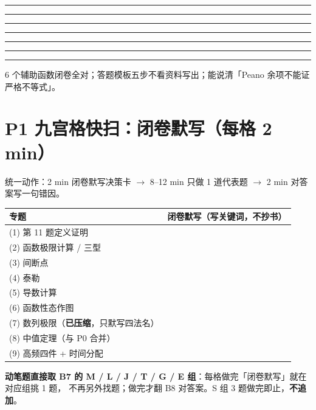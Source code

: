 \documentclass[10pt,a4paper]{ctexart}
\renewcommand{\arraystretch}{1.30}
\begin{document}
\par\smallskip\noindent\rule{\linewidth}{0.25pt}\par\vspace{0.52cm}
\noindent\rule{\linewidth}{0.25pt}\par\vspace{0.52cm}
\noindent\rule{\linewidth}{0.25pt}\par\vspace{0.52cm}
\noindent\rule{\linewidth}{0.25pt}\par\vspace{0.52cm}
\noindent\rule{\linewidth}{0.25pt}\par\vspace{0.52cm}
\noindent\rule{\linewidth}{0.25pt}\par\vspace{0.52cm}
\noindent\rule{\linewidth}{0.25pt}\par\vspace{0.52cm}
\begin{keypoint}[验收]
6 个辅助函数闭卷全对；答题模板五步不看资料写出；能说清「Peano 余项不能证严格不等式」。
\end{keypoint}

\clearpage

\section*{P1 九宫格快扫：闭卷默写（每格 2 min）}
{\small 统一动作：2 min 闭卷默写决策卡 $\to$ 8--12 min 只做 1 道代表题 $\to$ 2 min 对答案写一句错因。}\par
\small
\setlength{\tabcolsep}{4pt}
\renewcommand{\arraystretch}{2.45}
\par
\begin{center}
\begin{tabular}{p{3.0cm}|p{13.4cm}}
\toprule
专题 & 闭卷默写（写关键词，不抄书） \\
\midrule
(1) 第 11 题定义证明 & \hrulefill \\
(2) 函数极限计算 / 三型 & \hrulefill \\
(3) 间断点 & \hrulefill \\
(4) 泰勒 & \hrulefill \\
(5) 导数计算 & \hrulefill \\
(6) 函数性态作图 & \hrulefill \\
(7) 数列极限（\textbf{已压缩}，只默写四法名） & \hrulefill \\
(8) 中值定理（与 P0 合并） & \hrulefill \\
(9) 高频四件 + 时间分配 & \hrulefill \\
\bottomrule
\end{tabular}
\end{center}
\renewcommand{\arraystretch}{1.30}
\normalsize
\vspace{0.4em}
\textbf{动笔题直接取 B7 的 M / L / J / T / G / E 组}：每格做完「闭卷默写」就在对应组挑 1 题，
不再另外找题；做完才翻 B8 对答案。S 组 3 题做完即止，\textbf{不追加}。
\vspace{0.4em}
\end{document}

